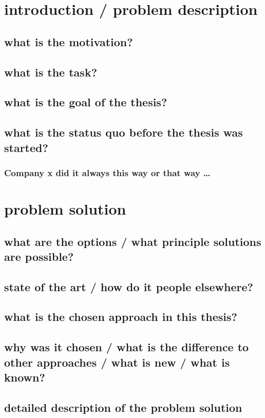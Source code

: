 
\section{introduction / problem description} 
\subsection{what is the motivation?}
\subsection{what is the task?}
\subsection{what is the goal of the thesis?}
\subsection{what is the status quo before the thesis was started?}
\subsubsection{Company x did it always this way or that way …}
\section{problem solution}
\subsection{what are the options / what principle solutions are possible?}
\subsection{state of the art / how do it people elsewhere?}
\subsection{what is the chosen approach in this thesis?}
\subsection{why was it chosen / what is the difference to other approaches / what is new / what is known?}
\subsection{detailed description of the problem solution}
